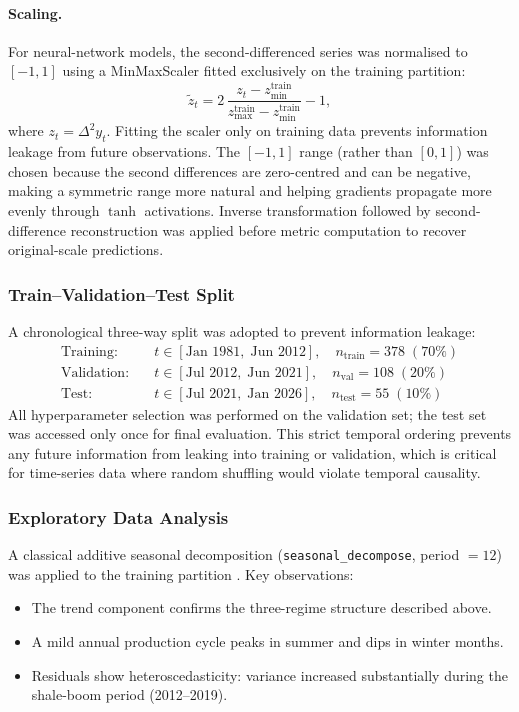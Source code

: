 \documentclass[12pt,a4paper]{article}
\begin{document}
\paragraph{Scaling.}
For neural-network models, the second-differenced series was normalised to $[-1,1]$ using a MinMaxScaler \citep{pedregosa2011} fitted exclusively on the training partition:
\begin{equation}
  \tilde{z}_t = 2\,\frac{z_t - z_{\min}^{\text{train}}}{z_{\max}^{\text{train}} - z_{\min}^{\text{train}}} - 1,
  \label{eq:minmax}
\end{equation}
where $z_t = \Delta^2 y_t$. Fitting the scaler only on training data prevents information leakage from future observations. The $[-1,1]$ range (rather than $[0,1]$) was chosen because the second differences are zero-centred and can be negative, making a symmetric range more natural and helping gradients propagate more evenly through $\tanh$ activations. Inverse transformation followed by second-difference reconstruction was applied before metric computation to recover original-scale predictions.

\subsubsection{Train--Validation--Test Split}

A chronological three-way split was adopted to prevent information leakage:
\begin{align*}
  \text{Training:}   &\quad t \in [\text{Jan 1981},\;\text{Jun 2012}], \quad n_{\text{train}} = 378 \;(70\%) \\
  \text{Validation:} &\quad t \in [\text{Jul 2012},\;\text{Jun 2021}], \quad n_{\text{val}}   = 108 \;(20\%) \\
  \text{Test:}        &\quad t \in [\text{Jul 2021},\;\text{Jan 2026}], \quad n_{\text{test}}  = 55  \;(10\%)
\end{align*}
All hyperparameter selection was performed on the validation set; the test set was accessed only once for final evaluation. This strict temporal ordering prevents any future information from leaking into training or validation, which is critical for time-series data where random shuffling would violate temporal causality.

\subsubsection{Exploratory Data Analysis}

A classical additive seasonal decomposition (\texttt{seasonal\_decompose}, period $= 12$) was applied to the training partition \citep{box2015}. Key observations:
\begin{itemize}
  \item The trend component confirms the three-regime structure described above.
  \item A mild annual production cycle peaks in summer and dips in winter months.
  \item Residuals show heteroscedasticity: variance increased substantially during the shale-boom period (2012--2019).
\end{itemize}
\end{document}
